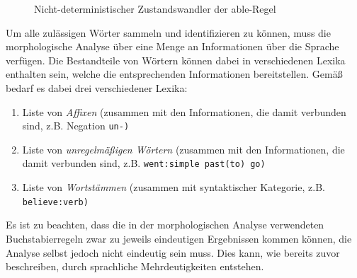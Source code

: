 \documentclass[12pt]{report}
\begin{document}
\begin{figure}[h!]
\begin{center}
\caption{Nicht-deterministischer Zustandswandler der able-Regel \cite{rs18}}
\end{center}
\end{figure}
Um alle zulässigen Wörter sammeln und identifizieren zu können, muss die morphologische Analyse über eine Menge an Informationen über die Sprache verfügen.
Die Bestandteile von Wörtern können dabei in verschiedenen Lexika enthalten sein, welche die entsprechenden Informationen bereitstellen. Gemäß \cite{cop04} bedarf es dabei drei verschiedener Lexika:

\begin{enumerate}
\item Liste von \textit{Affixen} (zusammen mit den Informationen, die damit verbunden sind, z.B. Negation \tt \glqq  un-\grqq{}\rm)
\item Liste von \textit{unregelmäßigen Wörtern} (zusammen mit den Informationen, die damit verbunden sind, z.B. \tt \glqq  went\grqq{}:simple past\glqq  (to) go\grqq{}\rm)
\item Liste von \textit{Wortstämmen} (zusammen mit syntaktischer Kategorie, z.B. \tt \glqq  believe\grqq{}:verb\rm)
\end{enumerate}

Es ist zu beachten, dass die in der morphologischen Analyse verwendeten Buchstabierregeln zwar zu jeweils eindeutigen Ergebnissen kommen können, die Analyse selbst jedoch nicht eindeutig sein muss. Dies kann, wie bereits zuvor beschreiben, durch sprachliche Mehrdeutigkeiten entstehen. 
\end{document}
